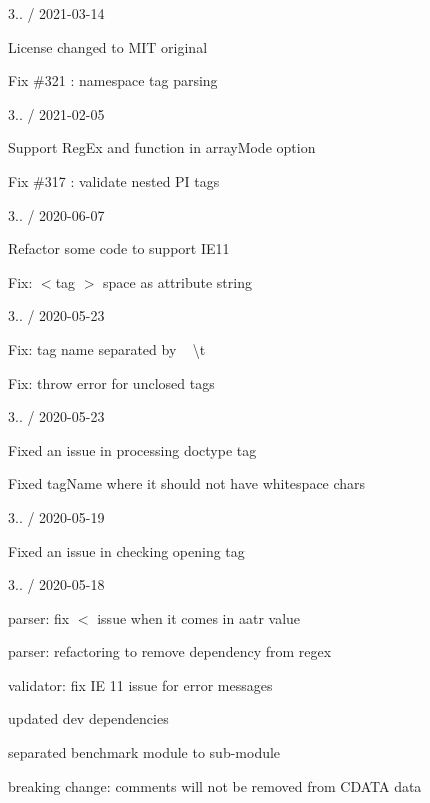 3.. / 2021-\/03-\/14
\begin{DoxyItemize}
\item License changed to MIT original
\item Fix \#321 \+: namespace tag parsing
\end{DoxyItemize}

3.. / 2021-\/02-\/05
\begin{DoxyItemize}
\item Support Reg\+Ex and function in array\+Mode option
\item Fix \#317 \+: validate nested PI tags
\end{DoxyItemize}

3.. / 2020-\/06-\/07
\begin{DoxyItemize}
\item Refactor some code to support IE11
\item Fix\+: {\ttfamily \texorpdfstring{$<$}{<}tag \texorpdfstring{$>$}{>}} space as attribute string
\end{DoxyItemize}

3.. / 2020-\/05-\/23
\begin{DoxyItemize}
\item Fix\+: tag name separated by ~\newline
 \textbackslash{}t
\item Fix\+: throw error for unclosed tags
\end{DoxyItemize}

3.. / 2020-\/05-\/23
\begin{DoxyItemize}
\item Fixed an issue in processing doctype tag
\item Fixed tag\+Name where it should not have whitespace chars
\end{DoxyItemize}

3.. / 2020-\/05-\/19
\begin{DoxyItemize}
\item Fixed an issue in checking opening tag
\end{DoxyItemize}

3.. / 2020-\/05-\/18
\begin{DoxyItemize}
\item parser\+: fix \textquotesingle{}\texorpdfstring{$<$}{<}\textquotesingle{} issue when it comes in aatr value
\item parser\+: refactoring to remove dependency from regex
\item validator\+: fix IE 11 issue for error messages
\item updated dev dependencies
\item separated benchmark module to sub-\/module
\item breaking change\+: comments will not be removed from CDATA data
\end{DoxyItemize}

